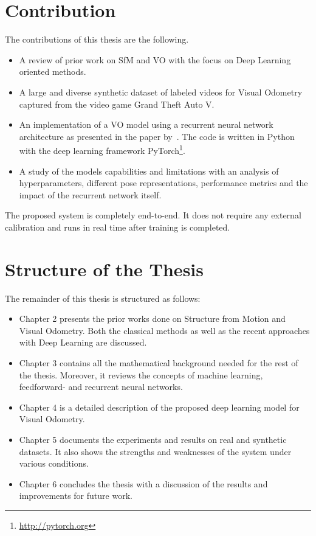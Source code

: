 	\section{Contribution}
		
		The contributions of this thesis are the following.
		\begin{itemize}
			\item A review of prior work on SfM and VO with the focus on Deep Learning oriented methods.
			
			\item A large and diverse synthetic dataset of labeled videos for Visual Odometry captured from the video game Grand Theft Auto V.
			
			\item An implementation of a VO model using a recurrent neural network architecture as presented in the paper by~\cite{wang2017deepvo}.
			The code is written in Python with the deep learning framework PyTorch\footnote{\url{http://pytorch.org}}.
			
			\item A study of the models capabilities and limitations with an analysis of hyperparameters, different pose representations, performance metrics and the impact of the recurrent network itself.
		\end{itemize}
		The proposed system is completely end-to-end.
		It does not require any external calibration and runs in real time after training is completed.
	
	\section{Structure of the Thesis}
		The remainder of this thesis is structured as follows:
		\begin{itemize}
			\item Chapter 2 presents the prior works done on Structure from Motion and Visual Odometry. 
			Both the classical methods as well as the recent approaches with Deep Learning are discussed.
			
			\item Chapter 3 contains all the mathematical background needed for the rest of the thesis.
			Moreover, it reviews the concepts of machine learning, feedforward- and recurrent neural networks.
			
			\item Chapter 4 is a detailed description of the proposed deep learning model for Visual Odometry.
			
			\item Chapter 5 documents the experiments and results on real and synthetic datasets.
			It also shows the strengths and weaknesses of the system under various conditions.
			
			\item Chapter 6 concludes the thesis with a discussion of the results and improvements for future work.
		\end{itemize}
	